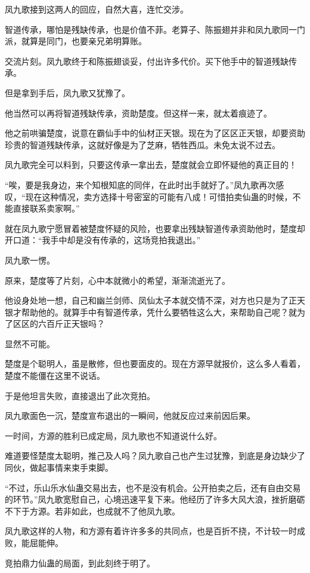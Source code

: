 \begin{this_body}
凤九歌接到这两人的回应，自然大喜，连忙交涉。

智道传承，哪怕是残缺传承，也是价值不菲。老算子、陈振翅并非和凤九歌同一门派，就算是同门，也要亲兄弟明算账。

交流片刻。凤九歌终于和陈振翅谈妥，付出许多代价。买下他手中的智道残缺传承。

但是拿到手后，凤九歌又犹豫了。

他当然可以再将智道残缺传承，资助楚度。但这样一来，就太着痕迹了。

他之前哄骗楚度，说意在霸仙手中的仙材正天银。现在为了区区正天银，却要资助珍贵的智道残缺传承，这就好像是为了芝麻，牺牲西瓜。未免太说不过去。

凤九歌完全可以料到，只要这传承一拿出去，楚度就会立即怀疑他的真正目的！

“唉，要是我身边，来个知根知底的同伴，在此时出手就好了。”凤九歌再次感叹，“现在这种情况，卖方选择十号密室的可能有八成！可惜拍卖仙蛊的时候，不能直接联系卖家啊。”

就在凤九歌宁愿冒着被楚度怀疑的风险，也要拿出残缺智道传承资助他时，楚度却开口道：“我手中却是没有传承的，这场竞拍我退出。”

凤九歌一愣。

原来，楚度等了片刻，心中本就微小的希望，渐渐流逝光了。

他设身处地一想，自己和幽兰剑师、凤仙太子本就交情不深，对方也只是为了正天银才帮助他的。就算手中有智道传承，凭什么要牺牲这么大，来帮助自己呢？就为了区区的六百斤正天银吗？

显然不可能。

楚度是个聪明人，虽是散修，但也要面皮的。现在方源早就报价，这么多人看着，楚度不能僵在这里不说话。

于是他坦言失败，直接退出了此次竞拍。

凤九歌面色一沉，楚度宣布退出的一瞬间，他就反应过来前因后果。

一时间，方源的胜利已成定局，凤九歌也不知道说什么好。

难道要怪楚度太聪明，推己及人吗？凤九歌自己也产生过犹豫，到底是身边缺少了同伙，做起事情来束手束脚。

“不过，乐山乐水仙蛊交易出去，也不是没有机会。公开拍卖之后，还有自由交易的环节。”凤九歌宽慰自己，心境迅速平复下来。他经历了许多大风大浪，挫折磨砺不下于方源。若非如此，也成就不了他凤九歌。

凤九歌这样的人物，和方源有着许许多多的共同点，也是百折不挠，不计较一时成败，能屈能伸。

竞拍鼎力仙蛊的局面，到此刻终于明了。


\end{this_body}
